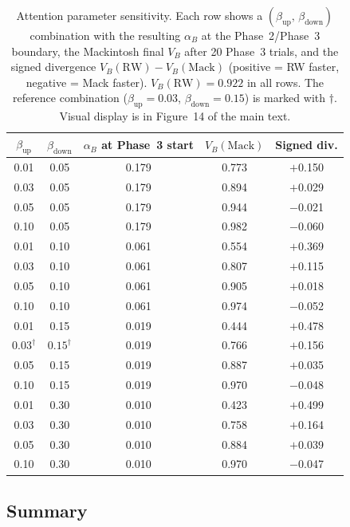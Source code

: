 \documentclass[11pt,a4paper]{article}
\begin{document}
\begin{table}[htbp]
\centering
\small
\caption{Attention parameter sensitivity. Each row shows a $(\beta_{\text{up}},\,\beta_{\text{down}})$ combination with the resulting $\alpha_B$ at the Phase~2/Phase~3 boundary, the Mackintosh final $V_B$ after 20 Phase~3 trials, and the signed divergence $V_B(\text{RW}) - V_B(\text{Mack})$ (positive = RW faster, negative = Mack faster). $V_B(\text{RW}) = 0.922$ in all rows. The reference combination ($\beta_{\text{up}} = 0.03$, $\beta_{\text{down}} = 0.15$) is marked with $\dagger$. Visual display is in Figure~14 of the main text.}
\label{tab:s5_attn}
\begin{tabular}{ccccc}
\toprule
$\beta_{\text{up}}$ & $\beta_{\text{down}}$ & $\alpha_B$ at Phase~3 start & $V_B(\text{Mack})$ & Signed div. \\
\midrule
0.01 & 0.05 & 0.179 & 0.773 & $+$0.150 \\
0.03 & 0.05 & 0.179 & 0.894 & $+$0.029 \\
0.05 & 0.05 & 0.179 & 0.944 & $-$0.021 \\
0.10 & 0.05 & 0.179 & 0.982 & $-$0.060 \\
\midrule
0.01 & 0.10 & 0.061 & 0.554 & $+$0.369 \\
0.03 & 0.10 & 0.061 & 0.807 & $+$0.115 \\
0.05 & 0.10 & 0.061 & 0.905 & $+$0.018 \\
0.10 & 0.10 & 0.061 & 0.974 & $-$0.052 \\
\midrule
0.01 & 0.15 & 0.019 & 0.444 & $+$0.478 \\
$0.03^\dagger$ & $0.15^\dagger$ & 0.019 & 0.766 & $+$0.156 \\
0.05 & 0.15 & 0.019 & 0.887 & $+$0.035 \\
0.10 & 0.15 & 0.019 & 0.970 & $-$0.048 \\
\midrule
0.01 & 0.30 & 0.010 & 0.423 & $+$0.499 \\
0.03 & 0.30 & 0.010 & 0.758 & $+$0.164 \\
0.05 & 0.30 & 0.010 & 0.884 & $+$0.039 \\
0.10 & 0.30 & 0.010 & 0.970 & $-$0.047 \\
\bottomrule
\end{tabular}
\end{table}

\subsection{Summary}
\label{sec:s2_summary}
\end{document}
